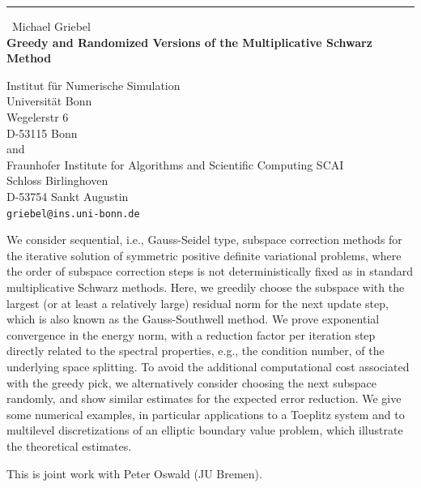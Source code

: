 \documentclass{report}
\begin{document}
\begin{center}
\rule{6in}{1pt} \
{\large Michael Griebel \\
{\bf Greedy and Randomized Versions of the Multiplicative Schwarz Method}}

Institut f\"ur Numerische Simulation \\ Universit\"at Bonn \\ Wegelerstr 6 \\ D-53115 Bonn \\ and \\ Fraunhofer Institute for Algorithms and Scientific Computing SCAI \\ Schloss Birlinghoven \\ D-53754 Sankt Augustin
\\
{\tt griebel@ins.uni-bonn.de}\end{center}

We consider sequential, i.e., Gauss-Seidel type, subspace correction
methods for the iterative solution of symmetric positive definite
variational problems, where the order of subspace correction steps is
not deterministically fixed as in standard multiplicative Schwarz
methods. Here, we greedily choose the subspace with the largest (or at
least a relatively large) residual norm for the next update step, which
is also known as the Gauss-Southwell method. We prove exponential
convergence in the energy norm, with a reduction factor per iteration
step directly related to the spectral properties, e.g., the condition
number, of the underlying space splitting. To avoid the additional
computational cost associated with the greedy pick, we alternatively
consider choosing the next subspace randomly, and show similar estimates
for the expected error reduction. We give some numerical examples, in
particular applications to a Toeplitz system and to multilevel
discretizations of an elliptic boundary value problem, which illustrate
the theoretical estimates.

This is joint work with Peter Oswald (JU Bremen).
\end{document}
